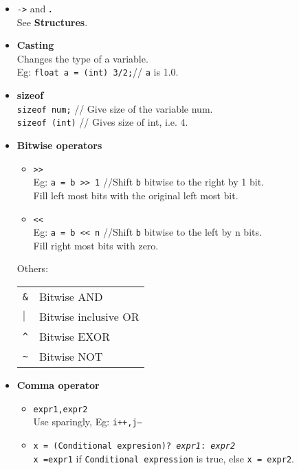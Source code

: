         \begin{itemize}
            \item \texttt{->} and \textbf{.}\\
            See \textbf{Structures}.
            \item \textbf{Casting}\\
            Changes the type of a variable.\\
            Eg:  \texttt{float a = (int) 3/2;}// \texttt{a} is 1.0.\\
            \item \textbf{sizeof}\\
            \texttt{sizeof num;} // Give size of the variable num.\\
            \texttt{sizeof (int)} // Gives size of int, i.e. 4.\\
            \item \textbf{Bitwise operators}
            \begin{itemize}
            \item \texttt{>>}\\
            Eg: \texttt{a = b >> 1} //Shift \texttt{b} bitwise to the right by 1 bit.\\
            Fill left most bits with the original left most bit.
            \item \texttt{<<}\\
            Eg: \texttt{a = b << n} //Shift \texttt{b} bitwise to the left by n bits.\\
            Fill right most bits with zero.
        \end{itemize}

        Others:\\
        \begin{tabularx}{\linewidth}{l|X}
            \hline
            \texttt{\&} & Bitwise AND\\
            \texttt{$\mid$} & Bitwise inclusive OR\\
            \texttt{\^} & Bitwise EXOR\\
            \texttt{\~} & Bitwise NOT\\
            \hline
        \end{tabularx}


        \item \textbf{Comma operator}
        \begin{itemize}
            \item \texttt{expr1,expr2}\\
            Use sparingly, Eg: \texttt{i++,j--}\\
            \item \texttt{x = (Conditional expresion)? \textit{expr1}: \textit{expr2}}\\
            \texttt{x =expr1} if \texttt{Conditional expression} is true, else \texttt{x = expr2}.
        \end{itemize}

        \end{itemize}

